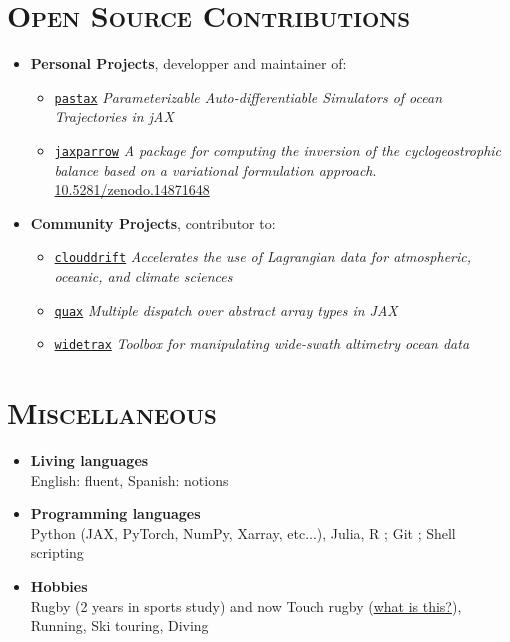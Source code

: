 \documentclass{article}
\begin{document}
\section*{\textsc{Open Source Contributions}}
\begin{itemize}
    \item[] \textbf{Personal Projects}, developper and maintainer of:
        \begin{itemize}[leftmargin=2cm]
            \item[] \href{https://github.com/vadmbertr/pastax}{\texttt{pastax}} \textit{Parameterizable Auto-differentiable Simulators of ocean Trajectories in jAX}
            \item[] \href{https://github.com/meom-group/jaxparrow}{\texttt{jaxparrow}} \textit{A package for computing the inversion of the cyclogeostrophic balance based on a variational formulation approach}. \href{https://doi.org/10.5281/zenodo.14871648}{10.5281/zenodo.14871648}
        \end{itemize}
    \item[] \textbf{Community Projects}, contributor to:
        \begin{itemize}[leftmargin=2cm]
            \item[] \href{https://github.com/Cloud-Drift/clouddrift}{\texttt{clouddrift}} \textit{Accelerates the use of Lagrangian data for atmospheric, oceanic, and climate sciences}
            \item[] \href{https://github.com/patrick-kidger/quax}{\texttt{quax}} \textit{Multiple dispatch over abstract array types in JAX}
            \item[] \href{https://github.com/meom-group/widetrax}{\texttt{widetrax}} \textit{Toolbox for manipulating wide-swath altimetry ocean data}
        \end{itemize}
\end{itemize}

\section*{\textsc{Miscellaneous}}
\begin{itemize}
    \item[] \textbf{Living languages} \\[.1 cm] 
        \tabto{2cm} English: fluent, Spanish: notions
    \item[] \textbf{Programming languages} \\[.1 cm] 
        \tabto{2cm} Python (JAX, PyTorch, NumPy, Xarray, etc...), Julia, R ; Git ; Shell scripting
    \item[] \textbf{Hobbies} \\[.1 cm] 
        \tabto{2cm} Rugby (2 years in sports study) and now Touch rugby (\href{https://youtu.be/yE_VXFf4pCk?si=aiIs_IFJW4eTuIwQ}{what is this?}), Running, Ski touring, Diving
\end{itemize}
\end{document}
